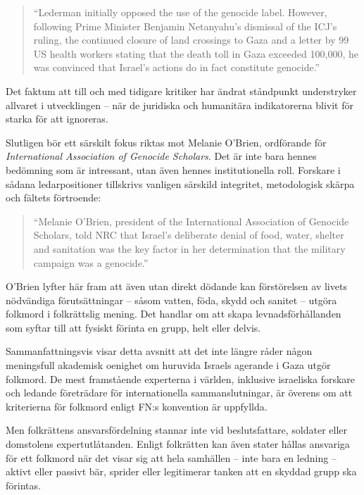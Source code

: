 \documentclass[12pt]{article}
\begin{document}
\begin{quote}
“Lederman initially opposed the use of the genocide label. However, following Prime Minister Benjamin Netanyahu’s dismissal of the ICJ’s ruling, the continued closure of land crossings to Gaza and a letter by 99 US health workers stating that the death toll in Gaza exceeded 100,000, he was convinced that Israel’s actions do in fact constitute genocide.”
\end{quote}

Det faktum att till och med tidigare kritiker har ändrat ståndpunkt understryker allvaret i utvecklingen – när de juridiska och humanitära indikatorerna blivit för starka för att ignoreras.

Slutligen bör ett särskilt fokus riktas mot Melanie O’Brien, ordförande för \textit{International Association of Genocide Scholars}. Det är inte bara hennes bedömning som är intressant, utan även hennes institutionella roll. Forskare i sådana ledarpositioner tillskrivs vanligen särskild integritet, metodologisk skärpa och fältets förtroende:

\begin{quote}
“Melanie O’Brien, president of the International Association of Genocide Scholars, told NRC that Israel’s deliberate denial of food, water, shelter and sanitation was the key factor in her determination that the military campaign was a genocide.”
\end{quote}

O’Brien lyfter här fram att även utan direkt dödande kan förstörelsen av livets nödvändiga förutsättningar – såsom vatten, föda, skydd och sanitet – utgöra folkmord i folkrättslig mening. Det handlar om att skapa levnadsförhållanden som syftar till att fysiskt förinta en grupp, helt eller delvis.

Sammanfattningsvis visar detta avsnitt att det inte längre råder någon meningsfull akademisk oenighet om huruvida Israels agerande i Gaza utgör folkmord. De mest framstående experterna i världen, inklusive israeliska forskare och ledande företrädare för internationella sammanslutningar, är överens om att kriterierna för folkmord enligt FN:s konvention är uppfyllda.

Men folkrättens ansvarsfördelning stannar inte vid beslutsfattare, soldater eller domstolens expertutlåtanden. Enligt folkrätten kan även stater hållas ansvariga för ett folkmord när det visar sig att hela samhällen – inte bara en ledning – aktivt eller passivt bär, sprider eller legitimerar tanken att en skyddad grupp ska förintas.
\end{document}
